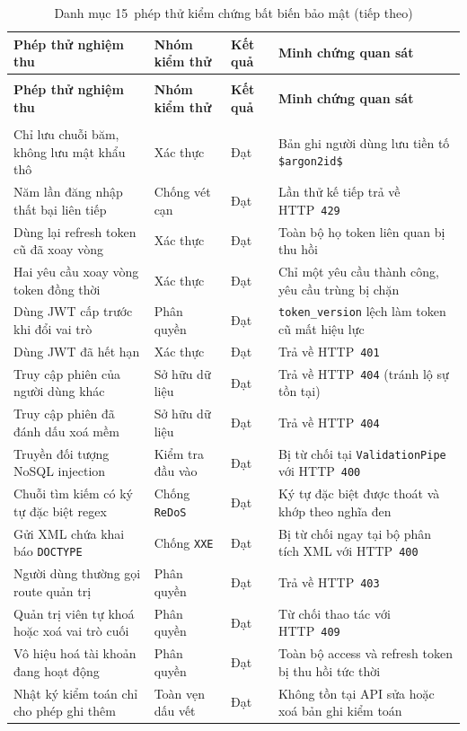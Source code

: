 \begingroup\small
\setlength{\tabcolsep}{5pt}
\begin{longtable}{
  @{}>{\raggedright\arraybackslash}p{4.6cm}
  >{\raggedright\arraybackslash}p{2.9cm}
  >{\raggedright\arraybackslash}p{1.6cm}
  >{\raggedright\arraybackslash}p{5.5cm}@{}
}
\caption{Danh mục 15~phép thử kiểm chứng bất biến bảo mật}
\label{tab:phep-thu-bao-mat-ch6} \\
\toprule
\textbf{Phép thử nghiệm thu} & \textbf{Nhóm kiểm thử} & \textbf{Kết quả} & \textbf{Minh chứng quan sát} \\
\midrule
\endfirsthead
\caption[]{Danh mục 15~phép thử kiểm chứng bất biến bảo mật (tiếp theo)} \\
\toprule
\textbf{Phép thử nghiệm thu} & \textbf{Nhóm kiểm thử} & \textbf{Kết quả} & \textbf{Minh chứng quan sát} \\
\midrule
\endhead
\midrule
\multicolumn{4}{r}{\textit{Xem tiếp ở trang sau}} \\
\endfoot
\bottomrule
\endlastfoot
Chỉ lưu chuỗi băm, không lưu mật khẩu thô & Xác thực & Đạt & Bản ghi người dùng lưu tiền tố \texttt{\$argon2id\$} \\
Năm lần đăng nhập thất bại liên tiếp & Chống vét cạn & Đạt & Lần thử kế tiếp trả về HTTP~\texttt{429} \\
Dùng lại refresh token cũ đã xoay vòng & Xác thực & Đạt & Toàn bộ họ token liên quan bị thu hồi \\
Hai yêu cầu xoay vòng token đồng thời & Xác thực & Đạt & Chỉ một yêu cầu thành công, yêu cầu trùng bị chặn \\
Dùng JWT cấp trước khi đổi vai trò & Phân quyền & Đạt & \texttt{token\_version} lệch làm token cũ mất hiệu lực \\
Dùng JWT đã hết hạn & Xác thực & Đạt & Trả về HTTP~\texttt{401} \\
Truy cập phiên của người dùng khác & Sở hữu dữ liệu & Đạt & Trả về HTTP~\texttt{404} (tránh lộ sự tồn tại) \\
Truy cập phiên đã đánh dấu xoá mềm & Sở hữu dữ liệu & Đạt & Trả về HTTP~\texttt{404} \\
Truyền đối tượng NoSQL injection & Kiểm tra đầu vào & Đạt & Bị từ chối tại \texttt{ValidationPipe} với HTTP~\texttt{400} \\
Chuỗi tìm kiếm có ký tự đặc biệt regex & Chống \texttt{ReDoS} & Đạt & Ký tự đặc biệt được thoát và khớp theo nghĩa đen \\
Gửi XML chứa khai báo \texttt{DOCTYPE} & Chống \texttt{XXE} & Đạt & Bị từ chối ngay tại bộ phân tích XML với HTTP~\texttt{400} \\
Người dùng thường gọi route quản trị & Phân quyền & Đạt & Trả về HTTP~\texttt{403} \\
Quản trị viên tự khoá hoặc xoá vai trò cuối & Phân quyền & Đạt & Từ chối thao tác với HTTP~\texttt{409} \\
Vô hiệu hoá tài khoản đang hoạt động & Phân quyền & Đạt & Toàn bộ access và refresh token bị thu hồi tức thời \\
Nhật ký kiểm toán chỉ cho phép ghi thêm & Toàn vẹn dấu vết & Đạt & Không tồn tại API sửa hoặc xoá bản ghi kiểm toán \\
\end{longtable}
\endgroup


